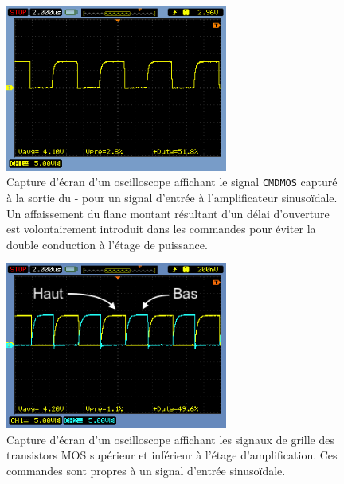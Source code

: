\documentclass[10pt, oneside, a4paper]{article}
\begin{document}
\begin{figure}[p]
    \centering
    \includegraphics[width=0.65\textwidth]{image/osci-cmdmos.png}
    \caption{Capture d'écran d'un oscilloscope affichant le signal \texttt{CMDMOS}
             capturé à la sortie du \Sigma{}-\Delta{} pour un signal d'entrée à
             l'amplificateur sinusoïdale.
             Un affaissement du flanc montant résultant d'un délai d'ouverture est
             volontairement introduit dans les commandes pour éviter la double conduction
             à l'étage de puissance.}
    \label{fig:osci-cmdmos}
\end{figure}

\begin{figure}[p]
    \centering
    \includegraphics[width=0.65\textwidth]{image/osci-high-low.png}
    \caption{Capture d'écran d'un oscilloscope affichant les signaux de grille des
             transistors MOS supérieur et inférieur à l'étage d'amplification.
             Ces commandes sont propres à un signal d'entrée sinusoïdale.}
    \label{fig:osci-high-low}
\end{figure}
\end{document}
